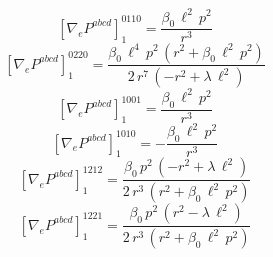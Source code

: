 \documentclass[11pt]{article}
\begin{document}
\begin{dmath*}[breakdepth={5}]
\left[\nabla_e P^{abcd}\right]_{1}^{0110} = \frac{\beta_{0}\,{\ell}^{2}\,{p}^{2}}{{r}^{3}}
\end{dmath*}
\begin{dmath*}[breakdepth={5}]
\left[\nabla_e P^{abcd}\right]_{1}^{0220} = \frac{\beta_{0}\,{\ell}^{4}\,{p}^{2}\,\left({r}^{2} + \beta_{0}\,{\ell}^{2}\,{p}^{2}\right)}{2\,{r}^{7}\,\left(-{r}^{2} + \lambda\,{\ell}^{2}\right)}
\end{dmath*}
\begin{dmath*}[breakdepth={5}]
\left[\nabla_e P^{abcd}\right]_{1}^{1001} = \frac{\beta_{0}\,{\ell}^{2}\,{p}^{2}}{{r}^{3}}
\end{dmath*}
\begin{dmath*}[breakdepth={5}]
\left[\nabla_e P^{abcd}\right]_{1}^{1010} = -\frac{\beta_{0}\,{\ell}^{2}\,{p}^{2}}{{r}^{3}}
\end{dmath*}
\begin{dmath*}[breakdepth={5}]
\left[\nabla_e P^{abcd}\right]_{1}^{1212} = \frac{\beta_{0}\,{p}^{2}\,\left(-{r}^{2} + \lambda\,{\ell}^{2}\right)}{2\,{r}^{3}\,\left({r}^{2} + \beta_{0}\,{\ell}^{2}\,{p}^{2}\right)}
\end{dmath*}
\begin{dmath*}[breakdepth={5}]
\left[\nabla_e P^{abcd}\right]_{1}^{1221} = \frac{\beta_{0}\,{p}^{2}\,\left({r}^{2} - \lambda\,{\ell}^{2}\right)}{2\,{r}^{3}\,\left({r}^{2} + \beta_{0}\,{\ell}^{2}\,{p}^{2}\right)}
\end{dmath*}
\end{document}
